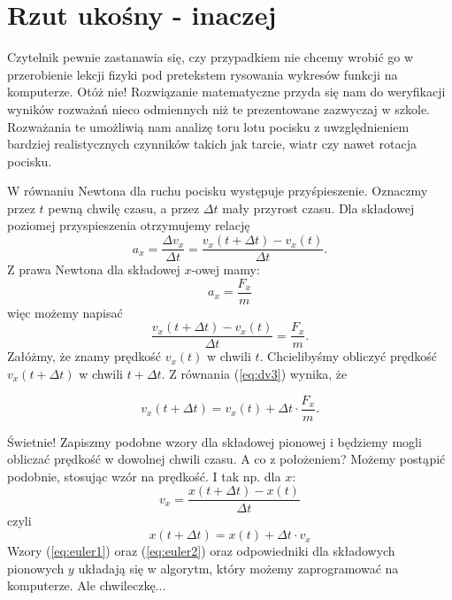 \documentclass[10pt,twocolumn]{article}
\begin{document}
\section{Rzut ukośny - inaczej}

Czytelnik pewnie zastanawia się, czy przypadkiem nie chcemy wrobić go
w przerobienie lekcji fizyki pod pretekstem rysowania wykresów funkcji
na komputerze. Otóż nie! Rozwiązanie matematyczne przyda się nam do
weryfikacji wyników rozważań nieco odmiennych niż te prezentowane
zazwyczaj w szkole. Rozważania te umożliwią nam analizę toru lotu
pocisku z uwzględnieniem bardziej realistycznych czynników takich jak
tarcie, wiatr czy nawet rotacja pocisku.

W równaniu Newtona dla ruchu pocisku występuje przyśpieszenie.
Oznaczmy przez $t$ pewną chwilę czasu, a przez $\Delta t$ mały
przyrost czasu. Dla składowej poziomej przyspieszenia otrzymujemy
relację
%
\begin{equation}
a_x = \frac{\Delta v_x}{\Delta t}=\frac{v_x(t+\Delta t)-v_x(t)}{\Delta t}. 
\label{eq:dv} 
\end{equation}
%
Z prawa Newtona dla składowej $x$-owej mamy:
%
\begin{equation}
a_x = \frac{F_x}{m}
\label{eq:dv} 
\end{equation}
%
więc możemy napisać 
%
\begin{equation}
\frac{v_x(t+\Delta t)-v_x(t)}{\Delta t} = \frac{F_x}{m}.
\label{eq:dv3} 
\end{equation}
%
Załóżmy, że znamy prędkość $v_x(t)$ w chwili $t$. Chcielibyśmy
obliczyć prędkość $v_x(t+\Delta t)$ w chwili $t+\Delta t$.  Z równania
(\ref{eq:dv3}) wynika, że

\begin{equation}
v_x(t+\Delta t) =v_x(t) + \Delta t\cdot  \frac{F_x}{m}.
\label{eq:euler1} 
\end{equation}
  
Świetnie! Zapiszmy podobne wzory dla składowej pionowej  i będziemy
mogli obliczać prędkość w dowolnej chwili czasu. A co z położeniem?
Możemy postąpić podobnie, stosując wzór na prędkość. I tak np. dla $x$:
\begin{equation}
  v_x = \frac{x(t+\Delta t)-x(t)}{\Delta t}
\label{eq:dx}  
\end{equation}
czyli
\begin{equation}
x(t+\Delta t)= x(t)+ \Delta t \cdot v_x 
\label{eq:euler2}
\end{equation}
%
Wzory (\ref{eq:euler1}) oraz (\ref{eq:euler2}) oraz odpowiedniki dla
składowych pionowych $y$ układają się w algorytm, który możemy
zaprogramować na komputerze. Ale chwileczkę...
\end{document}
